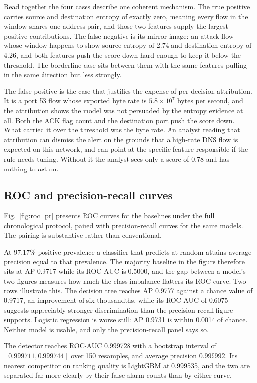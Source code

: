 \documentclass{ieeeaccess}
\begin{document}
Read together the four cases describe one coherent mechanism. The true positive
carries source and destination entropy of exactly zero, meaning every flow in
the window shares one address pair, and those two features supply the largest
positive contributions. The false negative is its mirror image: an attack flow
whose window happens to show source entropy of 2.74 and destination entropy of
4.26, and both features push the score down hard enough to keep it below the
threshold. The borderline case sits between them with the same features pulling
in the same direction but less strongly.

The false positive is the case that justifies the expense of per-decision
attribution. It is a port 53 flow whose exported byte rate is
$5.8\times10^{7}$ bytes per second, and the attribution shows the model was not
persuaded by the entropy evidence at all. Both the ACK flag count and the
destination port push the score down. What carried it over the threshold was the
byte rate. An analyst reading that attribution can dismiss the alert on the
grounds that a high-rate DNS flow is expected on this network, and can point at
the specific feature responsible if the rule needs tuning. Without it the analyst
sees only a score of 0.78 and has nothing to act on.

\subsection{ROC and precision-recall curves}
\label{sec:roc}
Fig.~\ref{fig:roc_pr} presents ROC curves for the baselines under the full
chronological protocol, paired with precision-recall curves for the same
models. The pairing is substantive rather than conventional.

At 97.17\% positive prevalence a classifier that predicts at random attains
average precision equal to that prevalence. The majority baseline in the figure
therefore sits at AP 0.9717 while its ROC-AUC is 0.5000, and the gap between a model's two figures measures how much the class imbalance
flatters its ROC curve. Two rows illustrate this. The decision tree reaches AP 0.9777
against a chance value of 0.9717, an improvement of six thousandths, while its ROC-AUC of 0.6075 suggests appreciably stronger discrimination than
the precision-recall figure supports. Logistic regression
is worse still: AP 0.9731 is within 0.0014 of chance. Neither model is usable,
and only the precision-recall panel says so.

The detector reaches ROC-AUC 0.999728 with a bootstrap interval of
$[0.999711, 0.999744]$ over 150 resamples, and average precision 0.999992. Its
nearest competitor on ranking quality is LightGBM at 0.999535, and the two are
separated far more clearly by their false-alarm counts than by either curve.
\end{document}
